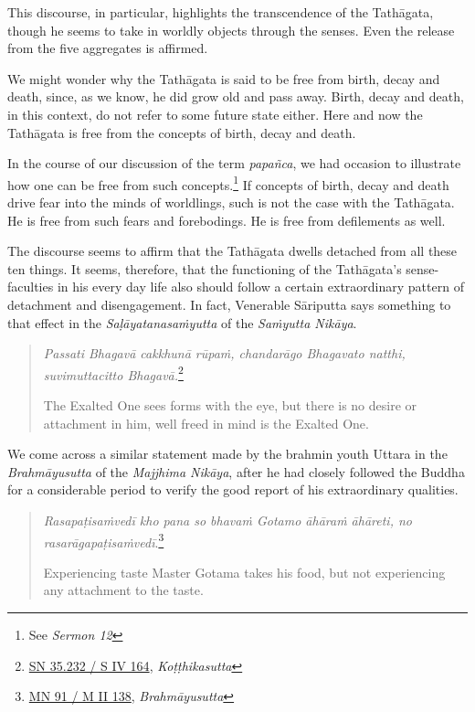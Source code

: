 This discourse, in particular, highlights the transcendence of the Tathāgata, though he seems to take in worldly objects through the senses. Even the release from the five aggregates is affirmed.

We might wonder why the Tathāgata is said to be free from birth, decay and death, since, as we know, he did grow old and pass away. Birth, decay and death, in this context, do not refer to some future state either. Here and now the Tathāgata is free from the concepts of birth, decay and death.

In the course of our discussion of the term \emph{papañca}, we had occasion to illustrate how one can be free from such concepts.\footnote{See \emph{Sermon 12}} If concepts of birth, decay and death drive fear into the minds of worldlings, such is not the case with the Tathāgata. He is free from such fears and forebodings. He is free from defilements as well.

The discourse seems to affirm that the Tathāgata dwells detached from all these ten things. It seems, therefore, that the functioning of the Tathāgata's sense-faculties in his every day life also should follow a certain extraordinary pattern of detachment and disengagement. In fact, Venerable Sāriputta says something to that effect in the \emph{Saḷāyatanasaṁyutta} of the \emph{Saṁyutta Nikāya}.

\begin{quote}
\emph{Passati Bhagavā cakkhunā rūpaṁ, chandarāgo Bhagavato natthi, suvimuttacitto Bhagavā.}\footnote{\href{https://suttacentral.net/sn35.232/pli/ms}{SN 35.232 / S IV 164}, \emph{Koṭṭhikasutta}}

The Exalted One sees forms with the eye, but there is no desire or attachment in him, well freed in mind is the Exalted One.
\end{quote}

We come across a similar statement made by the brahmin youth Uttara in the \emph{Brahmāyusutta} of the \emph{Majjhima Nikāya}, after he had closely followed the Buddha for a considerable period to verify the good report of his extraordinary qualities.

\begin{quote}
\emph{Rasapaṭisaṁvedī kho pana so bhavaṁ Gotamo āhāraṁ āhāreti, no rasarāgapaṭisaṁvedī}.\footnote{\href{https://suttacentral.net/mn91/pli/ms}{MN 91 / M II 138}, \emph{Brahmāyusutta}}

Experiencing taste Master Gotama takes his food, but not experiencing any attachment to the taste.
\end{quote}

